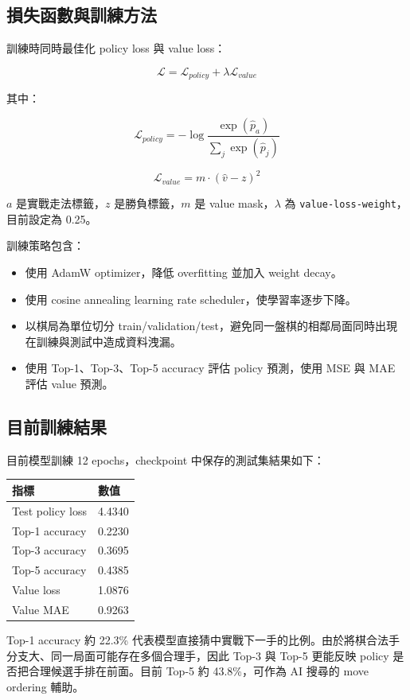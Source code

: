 \documentclass[12pt,a4paper,fontset=none]{ctexart}
\begin{document}
\subsection{損失函數與訓練方法}
訓練時同時最佳化 policy loss 與 value loss：

\[
\mathcal{L}
=
\mathcal{L}_{policy}
+
\lambda \mathcal{L}_{value}
\]

其中：

\[
\mathcal{L}_{policy}
=
-\log
\frac{\exp(\hat{p}_{a})}
{\sum_j \exp(\hat{p}_{j})}
\]

\[
\mathcal{L}_{value}
=
m \cdot (\hat{v} - z)^2
\]

$a$ 是實戰走法標籤，$z$ 是勝負標籤，$m$ 是 value mask，$\lambda$ 為 \texttt{value-loss-weight}，目前設定為 0.25。

訓練策略包含：

\begin{itemize}
  \item 使用 AdamW optimizer，降低 overfitting 並加入 weight decay。
  \item 使用 cosine annealing learning rate scheduler，使學習率逐步下降。
  \item 以棋局為單位切分 train/validation/test，避免同一盤棋的相鄰局面同時出現在訓練與測試中造成資料洩漏。
  \item 使用 Top-1、Top-3、Top-5 accuracy 評估 policy 預測，使用 MSE 與 MAE 評估 value 預測。
\end{itemize}

\subsection{目前訓練結果}
目前模型訓練 12 epochs，checkpoint 中保存的測試集結果如下：

\begin{longtable}{p{}p{}}
\toprule
\textbf{指標} & \textbf{數值}\\
\midrule
\endhead
Test policy loss & 4.4340\\
Top-1 accuracy & 0.2230\\
Top-3 accuracy & 0.3695\\
Top-5 accuracy & 0.4385\\
Value loss & 1.0876\\
Value MAE & 0.9263\\
\bottomrule
\end{longtable}

Top-1 accuracy 約 22.3\% 代表模型直接猜中實戰下一手的比例。由於將棋合法手分支大、同一局面可能存在多個合理手，因此 Top-3 與 Top-5 更能反映 policy 是否把合理候選手排在前面。目前 Top-5 約 43.8\%，可作為 AI 搜尋的 move ordering 輔助。
\end{document}
